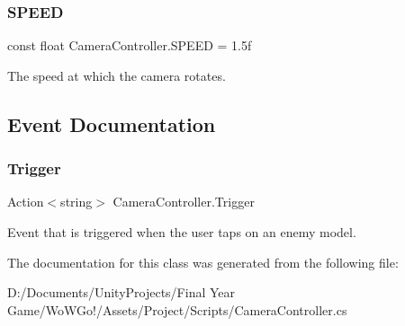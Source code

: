 \subsubsection{\texorpdfstring{SPEED}{SPEED}}
{\footnotesize\ttfamily const float Camera\+Controller.\+S\+P\+E\+ED = 1.\+5f\hspace{0.3cm}{\ttfamily [private]}}



The speed at which the camera rotates. 



\subsection{Event Documentation}
\mbox{\label{class_camera_controller_ad2d7bdece6ed6b583da7cda47cb83097}} 
\subsubsection{\texorpdfstring{Trigger}{Trigger}}
{\footnotesize\ttfamily Action$<$string$>$ Camera\+Controller.\+Trigger\hspace{0.3cm}{\ttfamily [static]}}



Event that is triggered when the user taps on an enemy model. 



The documentation for this class was generated from the following file\+:\begin{DoxyCompactItemize}
\item 
D\+:/\+Documents/\+Unity\+Projects/\+Final Year Game/\+Wo\+W\+Go!/\+Assets/\+Project/\+Scripts/Camera\+Controller.\+cs\end{DoxyCompactItemize}
